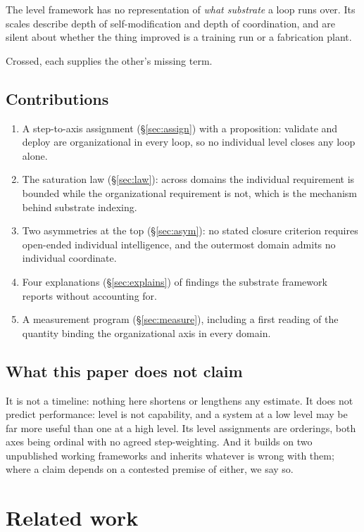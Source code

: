 \documentclass[11pt]{article}
\begin{document}
The level framework has no representation of \emph{what substrate} a loop runs over. Its scales describe depth of self-modification and depth of coordination, and are silent about whether the thing improved is a training run or a fabrication plant.

Crossed, each supplies the other's missing term.

\subsection{Contributions}

\begin{enumerate}[leftmargin=1.5em]
\item A step-to-axis assignment (\S\ref{sec:assign}) with a proposition: validate and deploy are organizational in every loop, so no individual level closes any loop alone.
\item The saturation law (\S\ref{sec:law}): across domains the individual requirement is bounded while the organizational requirement is not, which is the mechanism behind substrate indexing.
\item Two asymmetries at the top (\S\ref{sec:asym}): no stated closure criterion requires open-ended individual intelligence, and the outermost domain admits no individual coordinate.
\item Four explanations (\S\ref{sec:explains}) of findings the substrate framework reports without accounting for.
\item A measurement program (\S\ref{sec:measure}), including a first reading of the quantity binding the organizational axis in every domain.
\end{enumerate}

\subsection{What this paper does not claim}

It is not a timeline: nothing here shortens or lengthens any estimate. It does not predict performance: level is not capability, and a system at a low level may be far more useful than one at a high level. Its level assignments are orderings, both axes being ordinal with no agreed step-weighting. And it builds on two unpublished working frameworks and inherits whatever is wrong with them; where a claim depends on a contested premise of either, we say so.

\section{Related work}
\end{document}

